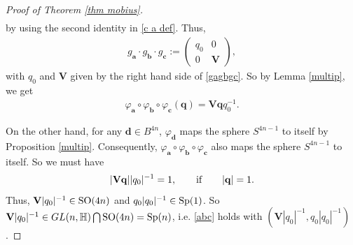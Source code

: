\documentclass[a4paper,11pt]{amsart}
\numberwithin{equation}{section}
\begin{document}
\begin{proof}[Proof of Theorem \ref{thm mobius}]
\begin{equation*}
\begin{aligned}
\end{aligned}\end{equation*}
by using the second identity in \eqref{c a def}.
Thus,
\begin{equation*}\begin{aligned}
 g_{\mathbf{a}}\cdot  g_{\mathbf{b}}\cdot  g_{\mathbf{c}}:=\begin{pmatrix} q_0 & 0\\ 0 & \mathbf{V} \end{pmatrix},
\end{aligned}\end{equation*}
with $q_0$ and $\mathbf{V}$ given by the right hand side of \eqref{gagbgc}. So by Lemma \ref{multip}, we get
\begin{equation*}\begin{aligned}
\varphi_{\mathbf{a}}\circ\varphi_{\mathbf{b}}\circ\varphi_{\mathbf{c}}(\mathbf{q})= \mathbf{V}\mathbf{q}q_0^{-1}.
 \end{aligned}\end{equation*}


   On the other hand, for any $\mathbf{d}\in B^{4n}$, $\varphi_{\mathbf{d}}$ maps the sphere $S^{4n-1}$ to itself by Proposition \ref{multip}.
Consequently, $\varphi_{\mathbf{a}}\circ\varphi_{\mathbf{b}}\circ\varphi_{\mathbf{c}}$ also maps the sphere $S^{4n-1}$ to itself. So we must have
\begin{equation*}\begin{aligned}
|\mathbf{V}\mathbf{q}||q_0|^{-1}=1, \qquad{\rm if}\qquad |\mathbf{q}|=1.
\end{aligned}\end{equation*}
Thus, $\mathbf{V}|q_0|^{-1}\in {\rm SO}(4n)$ and
 $q_0|q_0|^{-1}\in {\rm Sp}(1)$. So $\mathbf{V}|q_0|^{-1}\in GL(n,\mathbb{H})\bigcap {\rm SO}(4n)={\rm Sp}(n)$, i.e. \eqref{abc} holds with $(\mathbf{V}|q_0|^{-1},q_0|q_0|^{-1})$.


\end{proof}
\end{document}
